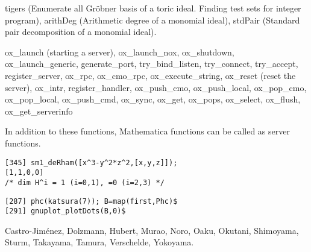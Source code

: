 \documentclass[twocolumn]{article}
\begin{document}
\noindent
{\color{red} tigers} (Enumerate all Gr\"obner basis of a toric ideal.
Finding test sets for integer program),
{\color{red} arithDeg} (Arithmetic degree of a monomial ideal),
{\color{red} stdPair} (Standard pair decomposition of a monomial ideal).

\medbreak
\noindent
{}

\noindent
{\color{red} ox\_launch} (starting a server), 
{\color{red} ox\_launch\_nox}, 
{\color{red} ox\_shutdown},
{\color{red} ox\_launch\_generic}, 
{\color{red} generate\_port}, 
{\color{red} try\_bind\_listen}, 
{\color{red} try\_connect}, 
{\color{red} try\_accept}, 
{\color{red} register\_server}, 
{\color{red} ox\_rpc}, 
{\color{red} ox\_cmo\_rpc}, 
{\color{red} ox\_execute\_string}, 
{\color{red} ox\_reset} (reset the server),
{\color{red} ox\_intr},
{\color{red} register\_handler}, 
{\color{red} ox\_push\_cmo}, 
{\color{red} ox\_push\_local},
{\color{red} ox\_pop\_cmo}, 
{\color{red} ox\_pop\_local}, 
{\color{red} ox\_push\_cmd}, 
{\color{red} ox\_sync},
{\color{red} ox\_get}, 
{\color{red} ox\_pops}, 
{\color{red} ox\_select}, 
{\color{red} ox\_flush},
{\color{red} ox\_get\_serverinfo}

\medbreak
\noindent
In addition to these functions, {\color{green} Mathematica functions} 
can be called as server functions.
\medbreak
\noindent
{}
{\footnotesize
\begin{verbatim}
[345] sm1_deRham([x^3-y^2*z^2,[x,y,z]]);
[1,1,0,0]
/* dim H^i = 1 (i=0,1), =0 (i=2,3) */
\end{verbatim}} 

\noindent
{\footnotesize \begin{verbatim}
[287] phc(katsura(7)); B=map(first,Phc)$
[291] gnuplot_plotDots(B,0)$
\end{verbatim} }

\epsfxsize=3cm
\begin{center}
\end{center}

\noindent


\medbreak
\noindent
{}
Castro-Jim\'enez, Dolzmann, Hubert, Murao, Noro, Oaku, Okutani, 
Shimoyama, Sturm, Takayama, Tamura, Verschelde, Yokoyama.

\medbreak
\vfill
\noindent
\rightline{ {\color{red} {\tt http://www.openxm.org} }}
\end{document}
